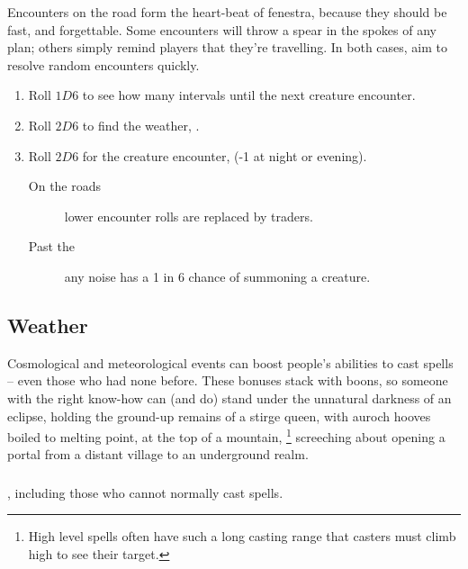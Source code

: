 \begin{multicols}{2}

\noindent
Encounters on the road form the heart-beat of \gls{fenestra}, because they should be fast, and forgettable.
Some encounters will throw a spear in the spokes of any plan; others simply remind players that they're travelling.
In both cases, aim to resolve random encounters quickly.

\begin{enumerate}
  \item
  Roll $1D6$ to see how many \glspl{interval} until the next creature encounter.
  \item
  Roll $2D6$ to find the weather, .
  \item
  Roll $2D6$ for the creature encounter,  (-1 at night or evening).
  \begin{description}
    \item[On the roads] lower encounter rolls are replaced by traders.
    \item[Past the ] any noise has a 1 in 6 chance of summoning a creature.
  \end{description}
\end{enumerate}

\subsection{Weather}
\label{weather}
Cosmological and meteorological events can boost people's abilities to cast spells -- even those who had none before.
These bonuses stack with \glspl{boon}, so someone with the right know-how can (and do) stand under the unnatural darkness of an eclipse, holding the ground-up remains of a stirge queen, with auroch hooves boiled to melting point, at the top of a mountain,%
\footnote{High level spells often have such a long casting range that casters must climb high to see their target.}
screeching about opening a portal from a distant \gls{village} to an underground realm.

\weatherChart

\subsubsection{}
, including those who cannot normally cast spells.


\end{multicols}
